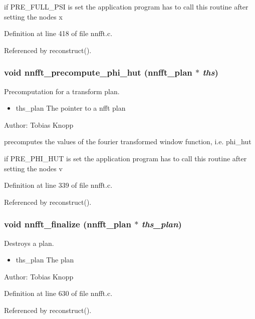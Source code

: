 if PRE\_\-FULL\_\-PSI is set the application program has to call this routine after setting the nodes x 

Definition at line 418 of file nnfft.c.

Referenced by reconstruct().\hypertarget{group__nnfft_g9e4663c2cdbff65da327400657528580}{
\subsubsection{\setlength{\rightskip}{0pt plus 5cm}void nnfft\_\-precompute\_\-phi\_\-hut ({\bf nnfft\_\-plan} $\ast$ {\em ths})}}
\label{group__nnfft_g9e4663c2cdbff65da327400657528580}


Precomputation for a transform plan. 

\begin{itemize}
\item ths\_\-plan The pointer to a nfft plan\end{itemize}
\begin{Desc}
\item[Author:]Tobias Knopp\end{Desc}
precomputes the values of the fourier transformed window function, i.e. phi\_\-hut

if PRE\_\-PHI\_\-HUT is set the application program has to call this routine after setting the nodes v 

Definition at line 339 of file nnfft.c.

Referenced by reconstruct().\hypertarget{group__nnfft_g9b5bcde6c436f8fe0e8d8dc4fa7a4230}{
\subsubsection{\setlength{\rightskip}{0pt plus 5cm}void nnfft\_\-finalize ({\bf nnfft\_\-plan} $\ast$ {\em ths\_\-plan})}}
\label{group__nnfft_g9b5bcde6c436f8fe0e8d8dc4fa7a4230}


Destroys a plan. 

\begin{itemize}
\item ths\_\-plan The plan\end{itemize}
\begin{Desc}
\item[Author:]Tobias Knopp \end{Desc}


Definition at line 630 of file nnfft.c.

Referenced by reconstruct().